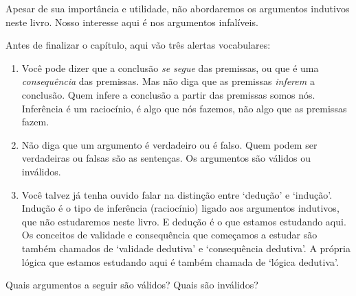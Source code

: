 Apesar de sua importância e utilidade, não abordaremos os argumentos indutivos neste livro.
Nosso interesse aqui é nos argumentos infalíveis.

Antes de finalizar o capítulo, aqui vão três alertas vocabulares:
\begin{enumerate}
	\item Você pode dizer que a conclusão \textit{se segue} das premissas, ou que é uma \textit{consequência} das premissas. Mas não diga que as premissas  \textit{inferem} a conclusão.
	Quem infere a conclusão a partir das premissas somos nós.
	 Inferência é um raciocínio, é algo que nós fazemos, não algo que as premissas fazem.
	\item Não diga que um argumento é verdadeiro ou é falso.
		Quem podem ser verdadeiras ou falsas são as sentenças.
		Os argumentos são válidos ou inválidos.
	\item Você talvez já tenha ouvido falar na distinção entre `dedução' e `indução'.
	Indução é o tipo de inferência (raciocínio) ligado aos argumentos indutivos, que não estudaremos neste livro. E dedução é o que estamos estudando aqui.
	Os conceitos de validade e consequência que começamos a estudar são também chamados de `validade dedutiva' e `consequência dedutiva'.
	A própria lógica que estamos estudando aqui é também chamada de `lógica dedutiva'.
\end{enumerate}


\practiceproblems
\problempart
Quais argumentos a seguir são válidos? Quais são inválidos?

